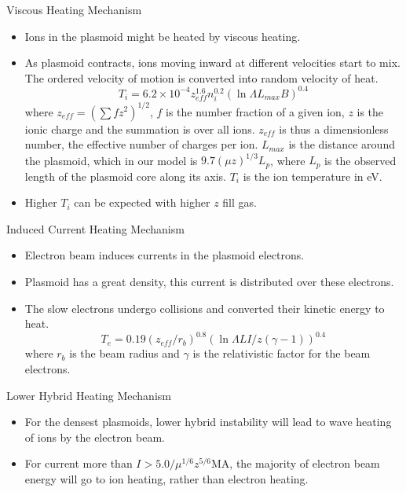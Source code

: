 \begin{frame} {Viscous Heating Mechanism}
    \begin{itemize}
        \item Ions in the plasmoid might be heated by viscous heating.
        \item As plasmoid contracts, ions moving inward at different velocities start to mix. The ordered velocity of motion is converted into random velocity of heat.
              \[ T_i = 6.2\times 10^{-4} z_{eff}^{1.6} n_i^{0.2} (\ln\Lambda L_{max}B)^{0.4} \]
              where $z_{eff} = (\sum fz^2)^{1/2}$, $f$ is the number fraction of a given ion, $z$ is the ionic charge and the summation is over all ions. $z_{eff}$ is thus a dimensionless number, the effective number of charges per ion. $L_{max}$ is the distance around the plasmoid, which in our model is $9.7(\mu z)^{1/3}L_p$, where $L_p$ is the observed length of the plasmoid core along its axis. $T_i$ is the ion temperature in eV.
        \item Higher $T_i$ can be expected with higher $z$ fill gas.
    \end{itemize}
\end{frame}

\begin{frame} {Induced Current Heating Mechanism}
    \begin{itemize}
        \item Electron beam induces currents in the plasmoid electrons.
        \item Plasmoid has a great density, this current is distributed over these electrons.
        \item The slow electrons undergo collisions and converted their kinetic energy to heat.
              \[ T_e = 0.19(z_{eff}/r_b)^{0.8}(\ln\Lambda LI/z(\gamma-1))^{0.4} \]
              where $r_b$ is the beam radius and $\gamma$ is the relativistic factor for the beam electrons.
    \end{itemize}
\end{frame}

\begin{frame} {Lower Hybrid Heating Mechanism}
    \begin{itemize}
        \item For the densest plasmoids, lower hybrid instability will lead to wave heating of ions by the electron beam.
        \item For current more than $I>5.0/\mu^{1/6}z^{5/6}$\unit{\mega\A}, the majority of electron beam energy will go to ion heating, rather than electron heating.
    \end{itemize}
\end{frame}

